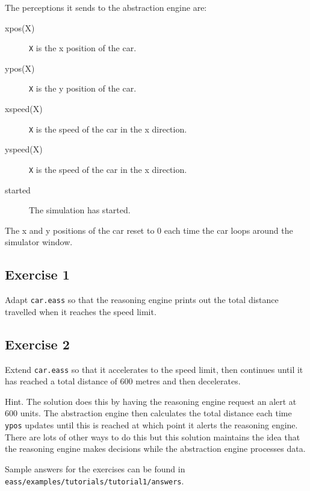 The perceptions it sends to the abstraction engine are:
\begin{description}
\item[xpos(X)] \texttt{X} is the x position of the car.
\item[ypos(X)] \texttt{X} is the y position of the car.
\item[xspeed(X)] \texttt{X} is the speed of the car in the x direction.
\item[yspeed(X)] \texttt{X} is the  speed of the car in the x direction.
\item[started] The simulation has started.
\end{description}
The x and y positions of the car reset to 0 each time the car loops around the simulator window.

\subsection{Exercise 1}
Adapt \texttt{car.eass} so that the reasoning engine prints out the total distance travelled when it reaches the speed limit.

\subsection{Exercise 2}
Extend \texttt{car.eass} so that it accelerates to the speed limit, then continues until it has reached a total distance of 600 metres and then decelerates.  

Hint. The solution does this by having the reasoning engine request an alert at 600 units.  The abstraction engine then calculates the total distance each time \texttt{ypos} updates until this is reached at which point it alerts the reasoning engine.  There are lots of other ways to do this but this solution maintains the idea that the reasoning engine makes decisions while the abstraction engine processes data.  

\begin{sloppypar}
Sample answers for the exercises can be found in \texttt{eass/examples/tutorials/tutorial1/answers}.
\end{sloppypar}

